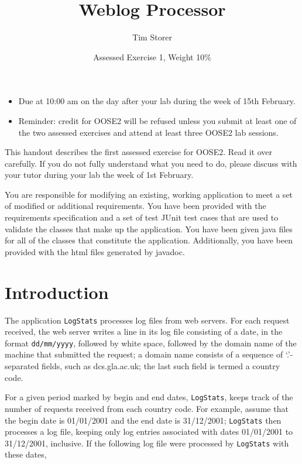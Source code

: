 \documentclass[12pt,a4paper]{article}
\title{Weblog Processor}
\author{Tim Storer}
\date{Assessed Exercise 1, Weight 10\%}
\begin{document}
\maketitle

\begin{itemize}
\item Due at 10:00 am on the day after your lab during the week of 15th
  February.
\item Reminder: credit for OOSE2 will be refused unless you submit at
  least one of the two assessed exercises and attend at least three
  OOSE2 lab sessions.
\end{itemize}

This handout describes the first assessed exercise for OOSE2.  Read it
over carefully.  If you do not fully understand what you need to do,
please discuss with your tutor during your lab the week of 1st
February.

You are responsible for modifying an existing, working application to
meet a set of modified or additional requirements.  You have been
provided with the requirements specification and a set of test JUnit
test cases that are used to validate the classes that make up the
application.  You have been given java files for all of the classes
that constitute the application.  Additionally, you have been provided
with the html files generated by javadoc.

\section{Introduction}

The application \lstinline!LogStats! processes log files from web
servers.  For each request received, the web server writes a line in
its log file consisting of a date, in the format \verb!dd/mm/yyyy!,
followed by white space, followed by the domain name of the machine
that submitted the request; a domain name consists of a sequence of
‘.’-separated fields, such as dcs.gla.ac.uk; the last such field is
termed a country code.

For a given period marked by begin and end dates,
\lstinline!LogStats!, keeps track of the number of requests received
from each country code.  For example, assume that the begin date is
01/01/2001 and the end date is 31/12/2001; \lstinline!LogStats! then
processes a log file, keeping only log entries associated with dates
01/01/2001 to 31/12/2001, inclusive.  If the following log file were
processed by \lstinline!LogStats! with these dates,
\end{document}
